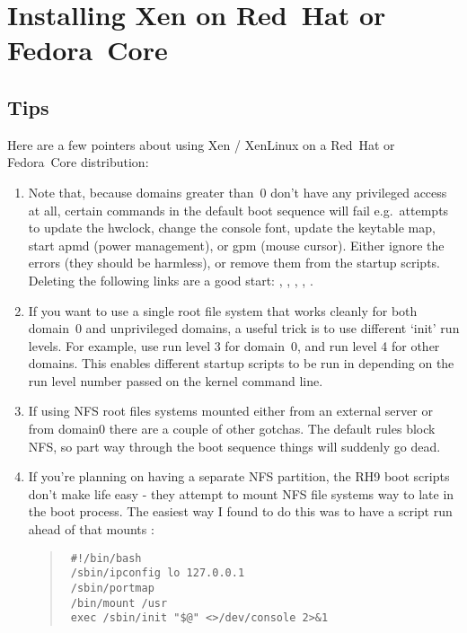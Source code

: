 \chapter{Installing Xen on Red~Hat or Fedora~Core}

\section{Tips}
Here are a few pointers about using Xen / XenLinux on a Red~Hat or
Fedora~Core distribution:

\begin{enumerate}
\item Note that, because domains greater than~0 don't have any
  privileged access at all, certain commands in the default boot
  sequence will fail e.g.\ attempts to update the hwclock, change the
  console font, update the keytable map, start apmd (power management),
  or gpm (mouse cursor). Either ignore the errors (they should be
  harmless), or remove them from the startup scripts. Deleting the
  following links are a good start: {},
  {}, {}, {},
  {}.

\item If you want to use a single root file system that works cleanly
  for both domain~0 and unprivileged domains, a useful trick is to use
  different `init' run levels. For example, use run level 3 for
  domain~0, and run level 4 for other domains. This enables different
  startup scripts to be run in depending on the run level number passed
  on the kernel command line.

\item If using NFS root files systems mounted either from an external
  server or from domain0 there are a couple of other gotchas. The
  default {} rules block NFS, so part way
  through the boot sequence things will suddenly go dead.

\item If you're planning on having a separate NFS {}
  partition, the RH9 boot scripts don't make life easy - they attempt to
  mount NFS file systems way to late in the boot process. The easiest
  way I found to do this was to have a {} script run
  ahead of {} that mounts {}:

  \begin{quote}
    \begin{small}\begin{verbatim}
 #!/bin/bash
 /sbin/ipconfig lo 127.0.0.1
 /sbin/portmap
 /bin/mount /usr
 exec /sbin/init "$@" <>/dev/console 2>&1
\end{verbatim}\end{small}
  \end{quote}


\end{enumerate}
